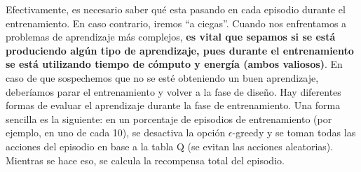 \documentclass{article}
\begin{document}
 Efectivamente, es necesario saber qué esta pasando en cada episodio durante el entrenamiento. En caso contrario, iremos ``a ciegas''. Cuando nos enfrentamos a problemas de aprendizaje más complejos, \textbf{es vital que sepamos si se está produciendo algún tipo de aprendizaje, pues durante el entrenamiento se está utilizando tiempo de cómputo y energía (ambos valiosos)}. En caso de que sospechemos que no se esté obteniendo un buen aprendizaje, deberíamos parar el entrenamiento y volver a la fase de diseño. Hay diferentes formas de evaluar el aprendizaje durante la fase de entrenamiento. Una forma sencilla es la siguiente: en un porcentaje de episodios de entrenamiento (por ejemplo, en uno de cada 10), se desactiva la opción $\epsilon$-greedy y se toman todas las acciones del episodio en base a la tabla Q (se evitan las acciones aleatorias). Mientras se hace eso, se calcula la recompensa total del episodio.
\end{document}
